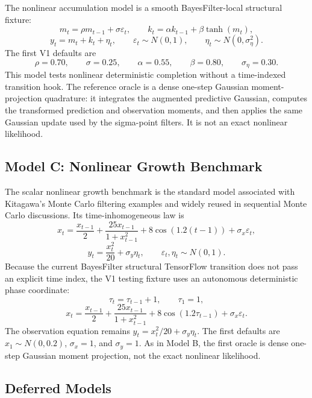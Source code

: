 The nonlinear accumulation model is a smooth BayesFilter-local structural
fixture:
\[
  m_t=\rho m_{t-1}+\sigma\varepsilon_t,\qquad
  k_t=\alpha k_{t-1}+\beta\tanh(m_t),
\]
\[
  y_t=m_t+k_t+\eta_t,\qquad
  \varepsilon_t\sim N(0,1),\qquad
  \eta_t\sim N(0,\sigma_\eta^2).
\]
The first V1 defaults are
\[
  \rho=0.70,\qquad \sigma=0.25,\qquad \alpha=0.55,\qquad
  \beta=0.80,\qquad \sigma_\eta=0.30.
\]
This model tests nonlinear deterministic completion without a time-indexed
transition hook.  The reference oracle is a dense one-step Gaussian
moment-projection quadrature: it integrates the augmented predictive Gaussian,
computes the transformed prediction and observation moments, and then applies
the same Gaussian update used by the sigma-point filters.  It is not an exact
nonlinear likelihood.

\subsection{Model C: Nonlinear Growth Benchmark}
\label{subsec:bf-nonlinear-model-c}

The scalar nonlinear growth benchmark is the standard model associated with
Kitagawa's Monte Carlo filtering examples \citep{kitagawa1996montecarlo} and
widely reused in sequential Monte Carlo discussions.  Its time-inhomogeneous
law is
\[
  x_t=\frac{x_{t-1}}{2}
      +\frac{25x_{t-1}}{1+x_{t-1}^2}
      +8\cos(1.2(t-1))
      +\sigma_x\varepsilon_t,
\]
\[
  y_t=\frac{x_t^2}{20}+\sigma_y\eta_t,
  \qquad \varepsilon_t,\eta_t\sim N(0,1).
\]
Because the current BayesFilter structural TensorFlow transition does not pass
an explicit time index, the V1 testing fixture uses an autonomous deterministic
phase coordinate:
\[
  \tau_t=\tau_{t-1}+1,\qquad \tau_1=1,
\]
\[
  x_t=\frac{x_{t-1}}{2}
      +\frac{25x_{t-1}}{1+x_{t-1}^2}
      +8\cos(1.2\tau_{t-1})
      +\sigma_x\varepsilon_t.
\]
The observation equation remains \(y_t=x_t^2/20+\sigma_y\eta_t\).  The first
defaults are \(x_1\sim N(0,0.2)\), \(\sigma_x=1\), and \(\sigma_y=1\).
As in Model B, the first oracle is dense one-step Gaussian moment projection,
not the exact nonlinear likelihood.

\subsection{Deferred Models}
\label{subsec:bf-nonlinear-deferred-models}


